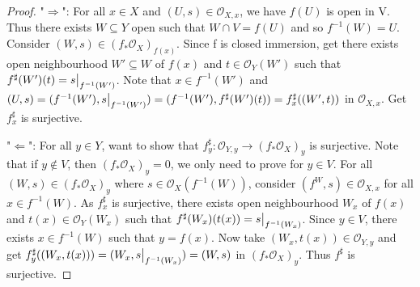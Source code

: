 \documentclass{ctexart}
\begin{document}
\begin{proof}
    "$\Rightarrow$": For all $x\in X$ and $(U, s)\in \mathcal{O}_{X, x}$, we have $f(U)$ is open in V.
    Thus there exists $W\subseteq Y$ open such that $W \cap V = f(U)$ and so $f^{-1}(W) = U$.
    Consider $(W, s)\in (f_{\ast}\mathcal{O}_{X})_{f(x)}$.
    Since f is closed immersion, get there exists open neighbourhood $W' \subseteq W$ of $f(x)$ and $t\in \mathcal{O}_{Y}(W')$ such that $f^{\sharp}(W')(t) = s\big{|}_{f^{-1}(W')}$.
    Note that $x\in f^{-1}(W')$ and $(U, s) = (f^{-1}(W'), s\big{|}_{f^{-1}(W')}) = (f^{-1}(W'), f^{\sharp}(W')(t)) = f_{x}^{\sharp}((W', t))$ in $\mathcal{O}_{X, x}$.
    Get $f_{x}^{\sharp}$ is surjective.
    \par
    "$\Leftarrow$": For all $y\in Y$, want to show that $f_{y}^{\sharp}: \mathcal{O}_{Y, y} \longrightarrow (f_{\ast}\mathcal{O}_{X})_{y}$ is surjective.
    Note that if $y\notin V$, then $(f_{\ast}\mathcal{O}_{X})_{y} = 0$, we only need to prove for $y\in V$.
    For all $(W, s)\in (f_{\ast}\mathcal{O}_{X})_{y}$ where $s\in \mathcal{O}_{X}(f^{-1}(W))$, consider $(f^{W}, s)\in \mathcal{O}_{X, x}$ for all $x\in f^{-1}(W)$.
    As $f_{x}^{\sharp}$ is surjective, there exists open neighbourhood $W_{x}$ of $f(x)$ and $t(x)\in \mathcal{O}_{Y}(W_{x})$ such that $f^{\sharp}(W_{x})(t(x)) = s\big{|}_{f^{-1}(W_{x})}$.  
    Since $y\in V$, there exists $x\in f^{-1}(W)$ such that $y = f(x)$.
    Now take $(W_{x}, t(x))\in \mathcal{O}_{Y, y}$ and get $f_{y}^{\sharp}((W_{x}, t(x))) = (W_{x}, s\big{|}_{f^{-1}(W_{x})}) = (W, s)$ in $(f_{\ast}\mathcal{O}_{X})_{y}$.
    Thus $f^{\sharp}$ is surjective.                                                                                                                                                                                                                                                                                                                                                                                                                                                                                                                                                                                                                                                                                                                                                                                                                                                                                                                                                                                                                                                                                                                                                               
\end{proof}
\end{document}

